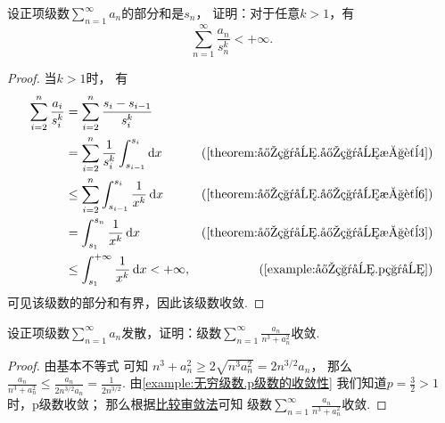 \begin{example}
设正项级数\(\sum\limits_{n=1}^\infty a_n\)的部分和是\(s_n\)，
证明：对于任意\(k>1\)，有\[
	\sum_{n=1}^\infty \frac{a_n}{s_n^k} < +\infty.
\]
\begin{proof}
当\(k>1\)时，
有\begin{align*}
	\sum_{i=2}^n \frac{a_i}{s_i^k}
	&= \sum_{i=2}^n \frac{s_i-s_{i-1}}{s_i^k} \\
	&= \sum_{i=2}^n \frac{1}{s_i^k} \int_{s_{i-1}}^{s_i} \dd{x}
			&(\text{\cref{theorem:定积分.定积分性质4}}) \\
	&\leq \sum_{i=2}^n \int_{s_{i-1}}^{s_i} \frac{1}{x^k} \dd{x}
			&(\text{\cref{theorem:定积分.定积分性质6}}) \\
	&= \int_{s_1}^{s_n} \frac{1}{x^k} \dd{x}
			&(\text{\cref{theorem:定积分.定积分性质3}}) \\
	&\leq \int_{s_1}^{+\infty} \frac{1}{x^k} \dd{x}
	< +\infty,
			&(\text{\cref{example:定积分.p积分}})
\end{align*}
可见该级数的部分和有界，因此该级数收敛.
\end{proof}
\end{example}

\begin{example}
设正项级数\(\sum\limits_{n=1}^\infty a_n\)发散，证明：级数\(\sum\limits_{n=1}^\infty \frac{a_n}{n^3+a_n^2}\)收敛.
\begin{proof}
由基本不等式  可知
\(n^3+a_n^2\geq2\sqrt{n^3 a_n^2}=2n^{3/2}a_n\)，
那么\(\frac{a_n}{n^3+a_n^2}\leq\frac{a_n}{2n^{3/2}a_n}=\frac{1}{2n^{3/2}}\).
由\cref{example:无穷级数.p级数的收敛性}
我们知道\(p=\frac{3}{2}>1\)时，p级数收敛；
那么根据\hyperref[theorem:无穷级数.正项级数的比较审敛法]{比较审敛法}可知
级数\(\sum\limits_{n=1}^\infty \frac{a_n}{n^3+a_n^2}\)收敛.
\end{proof}
\end{example}

